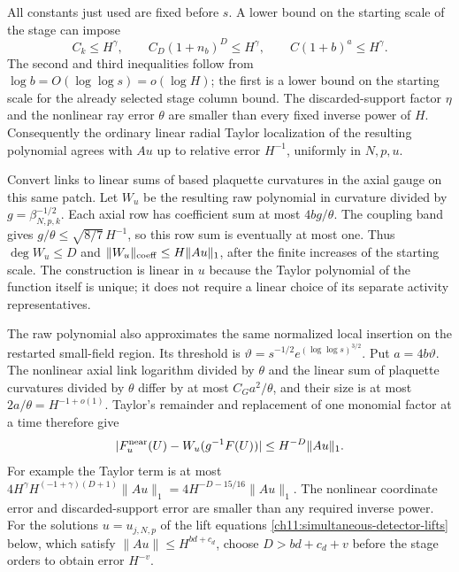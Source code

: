 All constants just used are fixed before $s$.
A lower bound on the starting scale of the stage can impose
\[
 C_k\le H^\gamma,\qquad
 C_D(1+n_b)^D\le H^\gamma,\qquad
 C(1+b)^a\le H^\gamma.
\]
The second and third inequalities follow from
$\log b=O(\log\log s)=o(\log H)$; the first is a lower bound on the starting scale for
the already selected stage column bound.
The discarded-support factor $\eta$ and the nonlinear ray
error $\theta$ are smaller than every fixed inverse power of $H$.
Consequently the ordinary linear radial Taylor localization of the resulting
polynomial agrees with $Au$ up to relative error $H^{-1}$,
uniformly in $N,p,u$.

Convert links to linear sums of based plaquette curvatures in the
axial gauge on this same patch. Let $W_u$ be the resulting raw
polynomial in curvature divided by $g=\beta_{N,p,k}^{-1/2}$.
Each axial row has coefficient sum at most $4bg/\theta$.
The coupling band gives
$g/\theta\le\sqrt{8/7}\,H^{-1}$, so this row sum is eventually
at most one. Thus $\deg W_u\le D$ and
$\|W_u\|_{\rm coeff}\le H\|Au\|_1$, after the finite increases of the starting scale.
The construction is linear in $u$ because the Taylor polynomial
of the function itself is unique; it does not require a linear
choice of its separate activity representatives.

The raw polynomial also approximates the same normalized local insertion
on the restarted small-field region. Its threshold is
$\vartheta=s^{-1/2}e^{(\log\log s)^{3/2}}$.
Put $a=4b\vartheta$. The nonlinear axial link logarithm divided
by $\theta$ and the linear sum of plaquette curvatures divided
by $\theta$ differ by at most $C_Ga^2/\theta$, and their size is
at most $2a/\theta=H^{-1+o(1)}$.
Taylor's remainder and replacement of one monomial factor at
a time therefore give
\begin{equation}\label{ch11:raw-polynomial-error}
 |F_u^{\rm near}(U)-W_u(g^{-1}F(U))|
       \le H^{-D}\|Au\|_1.
\end{equation}
For example the Taylor term is at most
$4H^\gamma H^{(-1+\gamma)(D+1)}\|Au\|_1
 =4H^{-D-15/16}\|Au\|_1$.
The nonlinear coordinate error and discarded-support error
are smaller than any required inverse power.
For the solutions $u=u_{j,N,p}$ of the lift equations \eqref{ch11:simultaneous-detector-lifts} below, which satisfy
$\|Au\|\le H^{bd+c_d}$, choose $D>bd+c_d+v$ before the stage
orders to obtain error $H^{-v}$.

